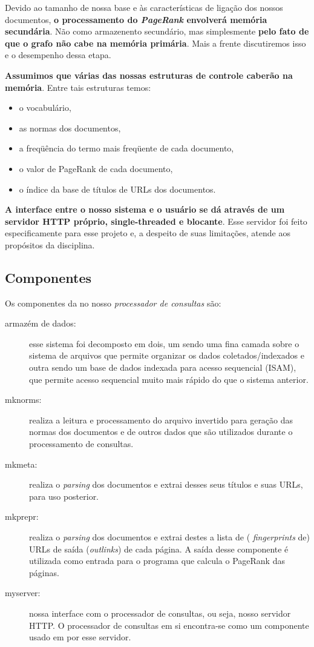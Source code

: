 \documentclass[10pt,twocolumn]{article}
\begin{document}
Devido ao tamanho de nossa base e às características de ligação dos
nossos documentos, \textbf{o processamento do \emph{PageRank} envolverá
memória secundária}. Não como armazenento secundário, mas simplesmente
\textbf{pelo fato de que o grafo não cabe na memória primária}. Mais a
frente discutiremos isso e o desempenho dessa etapa.

\textbf{Assumimos que várias das nossas estruturas de controle caberão na
memória}. Entre tais estruturas temos:
\begin{itemize}
\item o vocabulário,
\item as normas dos documentos,
\item a freqüência do termo mais freqüente de cada documento,
\item o valor de PageRank de cada documento,
\item o índice da base de títulos de URLs dos documentos.
\end{itemize}

\textbf{A interface entre o nosso sistema e o usuário se dá através de um
servidor HTTP próprio, single-threaded e blocante}. Esse servidor foi
feito especificamente para esse projeto e, a despeito de suas
limitações, atende aos propósitos da disciplina.

\subsection{Componentes}


Os componentes da no nosso \emph{processador de consultas} são:
\begin{description}
\item[armazém de dados:] esse sistema foi decomposto em dois, um sendo 
uma fina camada sobre o sistema de arquivos que
permite organizar os dados coletados/indexados e outra sendo um base de
dados indexada para acesso sequencial (ISAM), que permite acesso
sequencial muito mais rápido do que o sistema anterior.
\item[mknorms:] realiza a leitura e processamento do arquivo invertido
para geração das normas dos documentos e de outros dados que são
utilizados durante o processamento de consultas.
\item[mkmeta:] realiza o \emph{parsing} dos documentos e extrai desses
seus títulos e suas URLs, para uso posterior.
\item[mkprepr:] realiza o \emph{parsing} dos documentos e extrai destes
a lista de ( \emph{fingerprints} de) URLs de saída (\emph{outlinks}) de
cada página. A saída desse componente é utilizada como entrada para o
programa que calcula o PageRank das páginas.
\item[myserver:] nossa interface com o processador de consultas, ou
seja, nosso servidor HTTP. O processador de consultas em si encontra-se
como um componente usado em por esse servidor.
\end{description}
\end{document}
